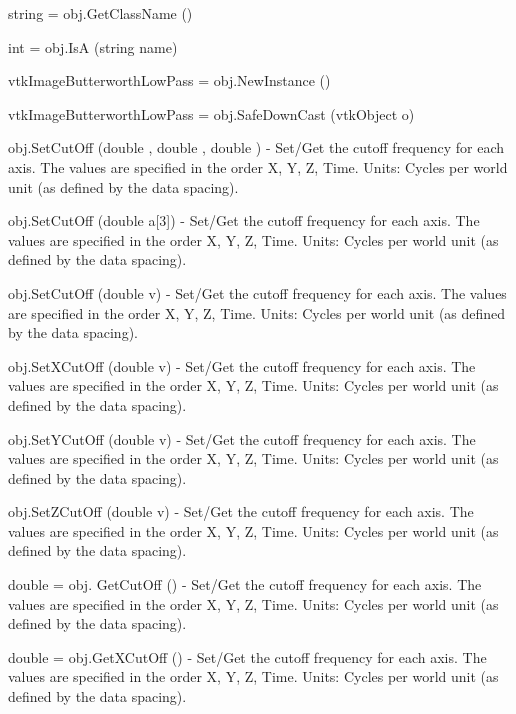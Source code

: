 \begin{DoxyItemize}
\item {\ttfamily string = obj.\-Get\-Class\-Name ()}  
\item {\ttfamily int = obj.\-Is\-A (string name)}  
\item {\ttfamily vtk\-Image\-Butterworth\-Low\-Pass = obj.\-New\-Instance ()}  
\item {\ttfamily vtk\-Image\-Butterworth\-Low\-Pass = obj.\-Safe\-Down\-Cast (vtk\-Object o)}  
\item {\ttfamily obj.\-Set\-Cut\-Off (double , double , double )} -\/ Set/\-Get the cutoff frequency for each axis. The values are specified in the order X, Y, Z, Time. Units\-: Cycles per world unit (as defined by the data spacing).  
\item {\ttfamily obj.\-Set\-Cut\-Off (double a\mbox{[}3\mbox{]})} -\/ Set/\-Get the cutoff frequency for each axis. The values are specified in the order X, Y, Z, Time. Units\-: Cycles per world unit (as defined by the data spacing).  
\item {\ttfamily obj.\-Set\-Cut\-Off (double v)} -\/ Set/\-Get the cutoff frequency for each axis. The values are specified in the order X, Y, Z, Time. Units\-: Cycles per world unit (as defined by the data spacing).  
\item {\ttfamily obj.\-Set\-X\-Cut\-Off (double v)} -\/ Set/\-Get the cutoff frequency for each axis. The values are specified in the order X, Y, Z, Time. Units\-: Cycles per world unit (as defined by the data spacing).  
\item {\ttfamily obj.\-Set\-Y\-Cut\-Off (double v)} -\/ Set/\-Get the cutoff frequency for each axis. The values are specified in the order X, Y, Z, Time. Units\-: Cycles per world unit (as defined by the data spacing).  
\item {\ttfamily obj.\-Set\-Z\-Cut\-Off (double v)} -\/ Set/\-Get the cutoff frequency for each axis. The values are specified in the order X, Y, Z, Time. Units\-: Cycles per world unit (as defined by the data spacing).  
\item {\ttfamily double = obj. Get\-Cut\-Off ()} -\/ Set/\-Get the cutoff frequency for each axis. The values are specified in the order X, Y, Z, Time. Units\-: Cycles per world unit (as defined by the data spacing).  
\item {\ttfamily double = obj.\-Get\-X\-Cut\-Off ()} -\/ Set/\-Get the cutoff frequency for each axis. The values are specified in the order X, Y, Z, Time. Units\-: Cycles per world unit (as defined by the data spacing).  

\end{DoxyItemize}
